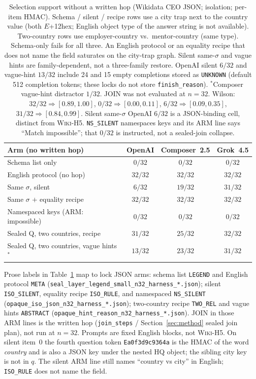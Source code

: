 \documentclass{article}
\begin{document}
\begin{table}[ht]
\centering
\small
\begin{tabular}{@{}lccc@{}}
\toprule
Arm (no written hop) & OpenAI & Composer~2.5 & Grok~4.5 \\
\midrule
Schema list only & $0/32$ & $0/32$ & $0/32$ \\
English protocol (no hop) & $32/32$ & $32/32$ & $32/32$ \\
Same $\sigma$, silent & $6/32$ & $19/32$ & $31/32$ \\
Same $\sigma$ $+$ equality recipe & $32/32$ & $32/32$ & $32/32$ \\
Namespaced keys (ARM: impossible) & $0/32$ & $0/32$ & $0/32$ \\
Sealed Q, two countries, recipe & $31/32$ & $25/32$ & $32/32$ \\
Sealed Q, two countries, vague hints$^{\ast}$ & $13/32$ & $23/32$ & $31/32$ \\
\bottomrule
\end{tabular}
\caption{Selection support without a written hop (Wikidata CEO JSON;
isolation; per-item HMAC).
Schema / silent / recipe rows use a city trap next to the country value
(both $E$+12hex; English object type of the answer string is not available).
Two-country rows use employer-country vs.\ mentor-country (same type).
Schema-only fails for all three.
An English protocol or an equality recipe that does not name the field
saturates on the city-trap graph.
Silent same-$\sigma$ and vague hints are family-dependent, not a
three-family restore.
OpenAI silent $6/32$ and vague-hint $13/32$ include 24 and 15 empty
completions stored as \texttt{UNKNOWN} (default 512 completion tokens;
these locks do not store \texttt{finish\_reason}).
$^{\ast}$Composer vague-hint distractor $1/32$. JOIN was not evaluated at
$n{=}32$. Wilson: $32/32 \Rightarrow [0.89,1.00]$,
$0/32 \Rightarrow [0.00,0.11]$,
$6/32 \Rightarrow [0.09,0.35]$,
$31/32 \Rightarrow [0.84,0.99]$.
Silent same-$\sigma$ OpenAI $6/32$ is a JSON-binding cell, distinct from
\textsc{Wiki-H5}.
\texttt{NS\_SILENT} namespaces keys and its ARM line says ``Match
impossible''; that $0/32$ is instructed, not a sealed-join collapse.}
\label{tab:ident32}
\end{table}

Prose labels in Table~\ref{tab:ident32} map to lock JSON arms:
schema list \texttt{LEGEND} and English protocol \texttt{META}
(\texttt{seal\_layer\_legend\_small\_n32\_harness\_*.json});
silent \texttt{ISO\_SILENT}, equality recipe \texttt{ISO\_RULE}, and
namespaced \texttt{NS\_SILENT}
(\texttt{opaque\_iso\_json\_n32\_harness\_*.json});
two-country recipe \texttt{TWO\_REL} and vague hints \texttt{ABSTRACT}
(\texttt{opaque\_hint\_reason\_n32\_harness\_*.json}).
JOIN in those ARM lines is the written hop (\texttt{join\_steps} /
Section~\ref{sec:method} sealed join plan), not run at $n{=}32$.
Prompts are fixed English blocks, not \textsc{Wiki-H5}.
On silent item~0 the fourth question token
\texttt{Ea0f3d9c9364a} is the HMAC of the word \emph{country} and is also a
JSON key under the nested HQ object; the sibling city key is not in $q$.
The silent ARM line still names ``country vs city'' in English;
\texttt{ISO\_RULE} does not name the field.
\end{document}
